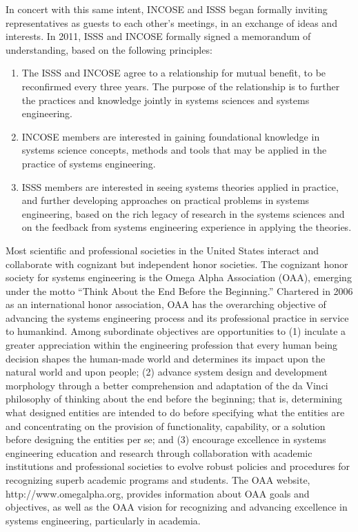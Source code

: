 In concert with this same intent, INCOSE and ISSS began formally inviting representatives as guests to each other’s meetings, in an exchange of ideas and interests. In 2011, ISSS and INCOSE formally signed a memorandum of understanding, based on the following principles:

\begin{enumerate}
\item The ISSS and INCOSE agree to a relationship for mutual benefit, to be reconfirmed every three years. The purpose of the relationship is to further the practices and knowledge jointly in systems sciences and systems engineering.
\item INCOSE members are interested in gaining foundational knowledge in systems science concepts, methods and tools that may be applied in the practice of systems engineering.
\item ISSS members are interested in seeing systems theories applied in practice, and further developing approaches on practical problems in systems engineering, based on the rich legacy of research in the systems sciences and on the feedback from systems engineering experience in applying the theories.
\end{enumerate}

Most scientific and professional societies in the United States interact and collaborate with cognizant but independent honor societies. The cognizant honor society for systems engineering is the Omega Alpha Association (OAA), emerging under the motto “Think About the End Before the Beginning.”  Chartered in 2006 as an international honor association, OAA has the overarching objective of advancing the systems engineering process and its professional practice in service to humankind. Among subordinate objectives are opportunities to (1) inculate a greater appreciation within the engineering profession that every human being decision shapes the human-made world and determines its impact upon the natural world and upon people; (2) advance system design and development morphology through a better comprehension and adaptation of the da Vinci philosophy of thinking about the end before the beginning; that is, determining what designed entities are intended to do before specifying what the entities are and concentrating on the provision of functionality, capability, or a solution before designing the entities per se; and (3) encourage excellence in systems engineering education and research through collaboration with academic institutions and professional societies to evolve robust policies and procedures for recognizing superb academic programs and students. The OAA website, http://www.omegalpha.org, provides information about OAA goals and objectives, as well as the OAA vision for recognizing and advancing excellence in systems engineering, particularly in academia.

